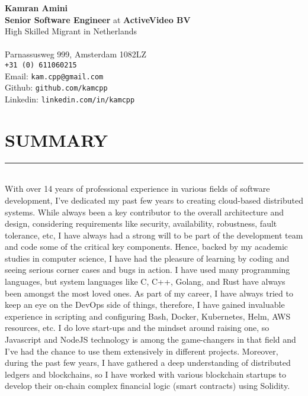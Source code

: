 \documentclass[10pt,a4paper]{article}
\begin{document}
\noindent \textbf{Kamran Amini} \\
\noindent \small \textbf{Senior Software Engineer} at \textbf{ActiveVideo BV} \\
\noindent \small High Skilled Migrant in Netherlands \\ \\
Parnassusweg 999, Amsterdam 1082LZ \\
\texttt{+31 (0) 611060215} \\
Email: \texttt{kam.cpp@gmail.com} \\
Github: \texttt{github.com/kamcpp} \\
Linkedin: \texttt{linkedin.com/in/kamcpp} 

\section{SUMMARY}
\noindent \rule {18.0cm}{0.2pt} \\
\small With over 14 years of professional experience in various fields of software development, I've dedicated my past few years to creating cloud-based distributed systems. While always been a key contributor to the overall architecture and design, considering requirements like security, availability, robustness, fault tolerance, etc, I have always had a strong will to be part of the development team and code some of the critical key components. Hence, backed by my academic studies in computer science, I have had the pleasure of learning by coding and seeing serious corner cases and bugs in action. I have used many programming languages, but system languages like C, C++, Golang, and Rust have always been amongst the most loved ones. As part of my career, I have always tried to keep an eye on the DevOps side of things, therefore, I have gained invaluable experience in scripting and configuring Bash, Docker, Kubernetes, Helm, AWS resources, etc. I do love start-ups and the mindset around raising one, so Javascript and NodeJS technology is among the game-changers in that field and I've had the chance to use them extensively in different projects. Moreover, during the past few years, I have gathered a deep understanding of distributed ledgers and blockchains, so I have worked with various blockchain startups to develop their on-chain complex financial logic (smart contracts) using Solidity.

\small
\end{document}
